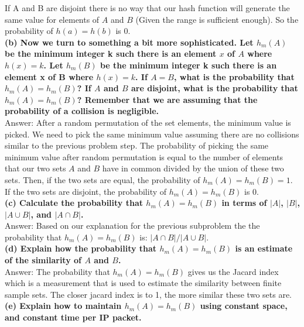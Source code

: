 \documentclass{article}
\begin{document}
If A and B are disjoint there is no way that our hash function will generate the same value for elements of $A$ and $B$ (Given the range is sufficient enough). So the probability of $h(a) = h(b)$ is 0. \\ \newline
\textbf{(b) Now we turn to something a bit more sophisticated. Let $h_m(A)$ be the minimum integer k such there is an element $x$ of $A$ where $h(x) = k$. Let $h_m(B)$ be the minimum integer k such there is an element x of B where $h(x) = k$. If $A = B$, what is the probability that $h_m(A) = h_m(B)$? If $A$ and $B$ are disjoint, what is the probability that $h_m(A) = h_m(B)$? Remember that we are assuming that the probability of a collision is negligible.}\\ \newline
Answer: After a random permutation of the set elements, the minimum value is picked. We need to pick the same minimum value assuming there are no collisions similar to the previous problem step. The probability of picking the same minimum value after random permutation is equal to the number of elements that our two sets $A$ and $B$ have in common divided by the union of these two sets. Then, if the two sets are equal, the probability of $h_m(A) = h_m(B) = 1$. If the two sets are disjoint, the probability of $h_m(A) = h_m(B)$ is 0.\\ \newline
\textbf{(c) Calculate the probability that $h_m(A) = h_m(B)$ in terms of $|A|$, $|B|$, $|A\cup B|$, and $|A\cap B|$.}\\ \newline
Answer: Based on our explanation for the previous subproblem the the probability that $h_m(A) = h_m(B)$ is: $|A\cap B| / |A\cup B|$. \\ \newline
\textbf{(d) Explain how the probability that $h_m(A) = h_m(B)$ is an estimate of the similarity of $A$ and $B$.} \\ \newline
Answer:  The probability that $h_m(A) = h_m(B)$ gives us the Jacard index which is a measurement that is used to estimate the similarity between finite sample sets. The closer jacard index is to 1, the more similar these two sets are. \\ \newline
\textbf{(e) Explain how to maintain $h_m(A) = h_m(B)$ using constant space, and constant time per IP packet.} \\ \newline
\end{document}
